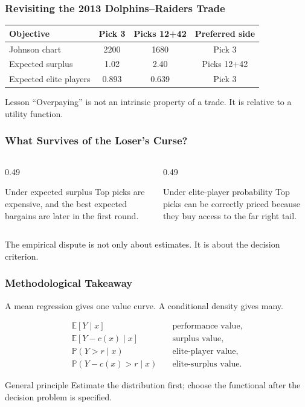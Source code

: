 \documentclass[aspectratio=169,professionalfonts]{beamer}
\newcommand{\E}{\mathbb{E}}
\newcommand{\Prb}{\mathbb{P}}
\begin{document}
\begin{frame}
\frametitle{Revisiting the 2013 Dolphins--Raiders Trade}
\begin{center}
\begin{tabular}{lccc}
\toprule
Objective & Pick 3 & Picks 12+42 & Preferred side\\
\midrule
Johnson chart & 2200 & 1680 & Pick 3\\
Expected surplus & 1.02 & 2.40 & Picks 12+42\\
Expected elite players & 0.893 & 0.639 & Pick 3\\
\bottomrule
\end{tabular}
\end{center}

\begin{block}{Lesson}
``Overpaying'' is not an intrinsic property of a trade. It is relative to a utility function.
\end{block}
\end{frame}

\begin{frame}
\frametitle{What Survives of the Loser's Curse?}
\begin{columns}[T,totalwidth=\textwidth]
\begin{column}{0.49\textwidth}
\begin{block}{Under expected surplus}
Top picks are expensive, and the best expected bargains are later in the first round.
\end{block}
\end{column}
\begin{column}{0.49\textwidth}
\begin{block}{Under elite-player probability}
Top picks can be correctly priced because they buy access to the far right tail.
\end{block}
\end{column}
\end{columns}

\vspace{4mm}
\centering
\Large
The empirical dispute is not only about estimates.\newline
It is about the decision criterion.
\end{frame}

\begin{frame}
\frametitle{Methodological Takeaway}
A mean regression gives one value curve. A conditional density gives many.

\vspace{2mm}
\begin{align*}
\E[Y\mid x] &\quad \text{performance value},\\
\E[Y-c(x)\mid x] &\quad \text{surplus value},\\
\Prb(Y>r\mid x) &\quad \text{elite-player value},\\
\Prb(Y-c(x)>r\mid x) &\quad \text{elite-surplus value}.
\end{align*}

\begin{block}{General principle}
Estimate the distribution first; choose the functional after the decision problem is specified.
\end{block}
\end{frame}
\end{document}
